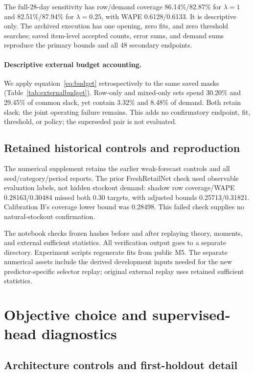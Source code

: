 
The full-28-day sensitivity has row/demand coverage 86.14\%/82.87\% for $\lambda=1$ and 82.51\%/87.94\% for $\lambda=0.25$, with WAPE 0.6128/0.6133. It is descriptive only. The archived execution has one opening, zero fits, and zero threshold searches; saved item-level accepted counts, error sums, and demand sums reproduce the primary bounds and all 48 secondary endpoints.

\paragraph{Descriptive external budget accounting.}
We apply equation~\eqref{eq:budget} retrospectively to the same saved masks (Table~\ref{tab:externalbudget}). Row-only and mixed-only sets spend 30.20\% and 29.45\% of common slack, yet contain 3.32\% and 8.48\% of demand. Both retain slack; the joint operating failure remains. This adds no confirmatory endpoint, fit, threshold, or policy; the superseded pair is not evaluated.


\subsection{Retained historical controls and reproduction}
\label{app:history}\label{app:legacyselection}
The numerical supplement retains the earlier weak-forecast controls and all seed/category/period reports. The prior FreshRetailNet check used observable evaluation labels, not hidden stockout demand: shadow row coverage/WAPE 0.28163/0.30484 missed both 0.30 targets, with adjusted bounds 0.25713/0.31821. Calibration B's coverage lower bound was 0.28498. This failed check supplies no natural-stockout confirmation.

The notebook checks frozen hashes before and after replaying theory, moments, and external sufficient statistics. All verification output goes to a separate directory. Experiment scripts regenerate fits from public M5. The separate numerical assets include the derived development inputs needed for the new predictor-specific selector replay; original external replay uses retained sufficient statistics.

\section{Objective choice and supervised-head diagnostics}
\label{app:objective}


\subsection{Architecture controls and first-holdout detail}
\label{app:architecture}


